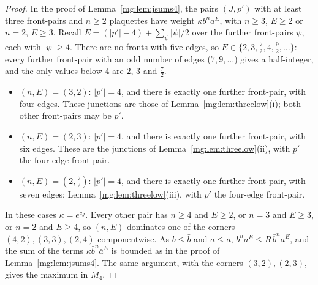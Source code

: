\documentclass[11pt,a4paper]{article}
\theoremstyle{definition}
\theoremstyle{remark}
\begin{document}
\begin{proof}
In the proof of Lemma~\ref{mg:lem:jsums4}, the pairs $(J,p')$ with at least three front-pairs and $n\ge2$ plaquettes have weight $\kappa b^na^E$, with $n\ge3$, $E\ge2$ or $n=2$, $E\ge3$. Recall
$E=(|p'|-4)+\sum_\psi|\psi|/2$ over the further front-pairs $\psi$, each with $|\psi|\ge4$. There are no fronts with five edges, so $E\in\{2,3,\frac72,4,\frac92,\dots\}$: every further front-pair with an
odd number of edges ($7,9,\dots$) gives a half-integer, and the only values below $4$ are $2$, $3$ and $\frac72$.
\begin{itemize}
\item $(n,E)=(3,2)$: $|p'|=4$, and there is exactly one further front-pair, with four edges. These junctions are those of Lemma~\ref{mg:lem:threelow}(i); both other front-pairs may be $p'$.
\item $(n,E)=(2,3)$: $|p'|=4$, and there is exactly one further front-pair, with six edges. These are the junctions of Lemma~\ref{mg:lem:threelow}(ii), with $p'$ the four-edge front-pair.
\item $(n,E)=(2,\frac72)$: $|p'|=4$, and there is exactly one further front-pair, with seven edges: Lemma~\ref{mg:lem:threelow}(iii), with $p'$ the four-edge front-pair.
\end{itemize}
In these cases $\kappa=e^{c_J}$. Every other pair has $n\ge4$ and $E\ge2$, or $n=3$ and $E\ge3$, or $n=2$ and $E\ge4$, so $(n,E)$ dominates one of the corners $(4,2),(3,3),(2,4)$
componentwise. As $b\le\bar b$ and $a\le\bar a$, $b^na^E\le R\,\bar b^n\bar a^E$, and the sum of the terms $\kappa\bar b^n\bar a^E$ is bounded as in the proof of
Lemma~\ref{mg:lem:jsums4}. The same argument, with the corners $(3,2),(2,3)$, gives the maximum in $M_4$.
\end{proof}
\end{document}
